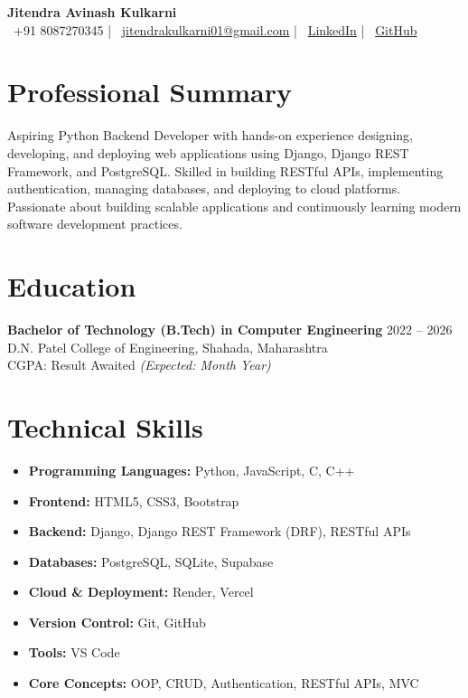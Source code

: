 \documentclass[10.5pt,a4paper]{article}
\newcommand{\resitem}[1]{\item #1}
\begin{document}
\begin{center}
    {\Huge \textbf{Jitendra Avinash Kulkarni}} \\[6pt]
    \faPhone\ +91 8087270345 \quad | \quad
    \faEnvelope\ \href{mailto:jitendrakulkarni01@gmail.com}{jitendrakulkarni01@gmail.com} \quad | \quad
    \faLinkedin\ \href{https://linkedin.com/in/PLACEHOLDER}{LinkedIn} \quad | \quad
    \faGithub\ \href{https://github.com/PLACEHOLDER}{GitHub}
\end{center}

\section*{Professional Summary}
Aspiring Python Backend Developer with hands-on experience designing, developing, and deploying web applications using Django, Django REST Framework, and PostgreSQL. Skilled in building RESTful APIs, implementing authentication, managing databases, and deploying to cloud platforms. Passionate about building scalable applications and continuously learning modern software development practices.

\section*{Education}
\textbf{Bachelor of Technology (B.Tech) in Computer Engineering} \hfill 2022 -- 2026 \\
D.N. Patel College of Engineering, Shahada, Maharashtra \\
CGPA: Result Awaited \hfill \textit{(Expected: Month Year)}

\section*{Technical Skills}
\begin{itemize}
    \resitem{\textbf{Programming Languages:} Python, JavaScript, C, C++}
    \resitem{\textbf{Frontend:} HTML5, CSS3, Bootstrap}
    \resitem{\textbf{Backend:} Django, Django REST Framework (DRF), RESTful APIs}
    \resitem{\textbf{Databases:} PostgreSQL, SQLite, Supabase}
    \resitem{\textbf{Cloud \& Deployment:} Render, Vercel}
    \resitem{\textbf{Version Control:} Git, GitHub}
    \resitem{\textbf{Tools:} VS Code}
    \resitem{\textbf{Core Concepts:} OOP, CRUD, Authentication, RESTful APIs, MVC}
\end{itemize}
\end{document}
